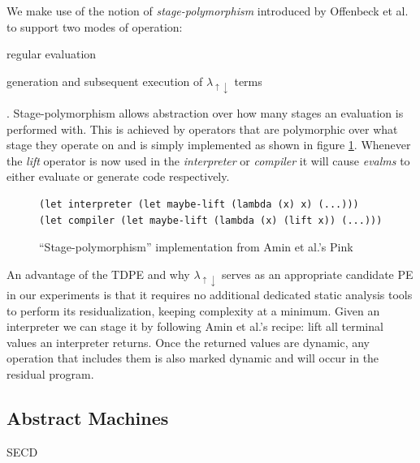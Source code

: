 \documentclass[a4paper,12pt,twoside,openright]{report}
\theoremstyle{definition}
\newcommand{\mslang}{$\lambda_{\uparrow\downarrow}$}
\begin{document}
We make use of the notion of \textit{stage-polymorphism} introduced by Offenbeck et al. \cite{ofenbeck2017staging} to support two modes of operation:
\begin{enumerate*}[label=(\arabic*)]
	\item regular evaluation
	\item generation and subsequent execution of \mslang{} terms
\end{enumerate*}.
Stage-polymorphism allows abstraction over how many stages an evaluation is performed with. This is achieved by operators that are polymorphic over what stage they operate on and is simply implemented as shown in figure \ref{lst:stage_poly_ex}. Whenever the \textit{lift} operator is now used in the \textit{interpreter} or \textit{compiler} it will cause \textit{evalms} to either evaluate or generate code respectively.

\begin{figure}[ht]
\centering
\begin{verbatim}
(let interpreter (let maybe-lift (lambda (x) x) (...)))
(let compiler (let maybe-lift (lambda (x) (lift x)) (...)))
\end{verbatim}
\caption{``Stage-polymorphism'' implementation from Amin et al.'s Pink \cite{amin2017collapsing}}
\label{lst:stage_poly_ex}
\end{figure}

An advantage of the TDPE and why \mslang{} serves as an appropriate candidate PE in our experiments is that it requires no additional dedicated static analysis tools to perform its residualization, keeping complexity at a minimum. Given an interpreter we can stage it by following Amin et al.'s \cite{amin2017collapsing} recipe: lift all terminal values an interpreter returns. Once the returned values are dynamic, any operation that includes them is also marked dynamic and will occur in the residual program.

\subsection{Abstract Machines}
SECD \cite{landin1964mechanical}
\end{document}
